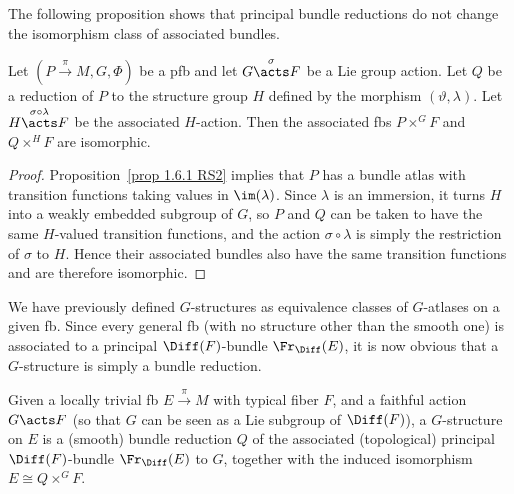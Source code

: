 The following proposition shows that principal bundle reductions do not change the isomorphism class of associated bundles.

\begin{prop}[{{\cite[Prop.~1.6.7]{RS2}}}]\label{prop 1.6.7 RS2}
    Let $(P\overset{\pi}{\to}M, G,\Phi)$ be a \gls{pfb} and let $G\overset{\sigma}{\acts}F$ be a Lie group action. Let $Q$ be a reduction of $P$ to the structure group $H$ defined by the morphism $(\vartheta,\lambda)$. Let $H\overset{\sigma\circ\lambda}{\acts}F$ be the associated $H$-action. Then the associated \glspl{fb} $P\times^G F$ and $Q\times^H F$ are isomorphic.
\end{prop}
\begin{proof}
    Proposition~\ref{prop 1.6.1 RS2} implies that $P$ has a bundle atlas with transition functions taking values in $\im(\lambda)$. Since $\lambda$ is an immersion, it turns $H$ into a weakly embedded subgroup of $G$, so $P$ and $Q$ can be taken to have the same $H$-valued transition functions, and the action $\sigma\circ\lambda$ is simply the restriction of $\sigma$ to $H$. Hence their associated bundles also have the same transition functions and are therefore isomorphic.
\end{proof}

We have previously defined $G$-structures as equivalence classes of $G$-atlases on a given \gls{fb}. Since every general \gls{fb} (with no structure other than the smooth one) is associated to a principal $\Diff(F)$-bundle $\Fr_{\Diff}(E)$, it is now obvious that a $G$-structure is simply a bundle reduction.

\begin{defn}[$G$-structure]
    Given a locally trivial \gls{fb} $E\overset{\pi}{\to}M$ with typical fiber $F$, and a faithful action $G\acts F$ (so that $G$ can be seen as a Lie subgroup of $\Diff(F)$), a $G$-structure on $E$ is a (smooth) bundle reduction $Q$ of the associated (topological) principal $\Diff(F)$-bundle $\Fr_{\Diff}(E)$ to $G$, together with the induced isomorphism $E\cong Q\times^G F$.
\end{defn}

